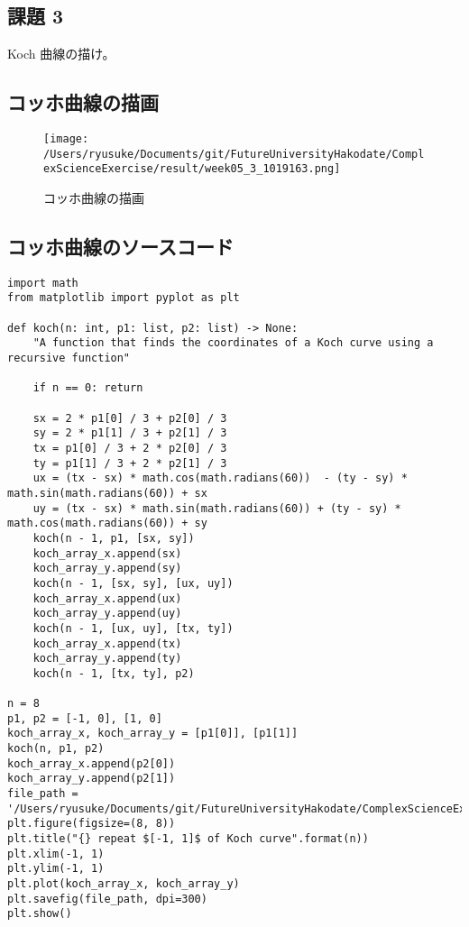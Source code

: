 \documentclass[a4j]{jsarticle}
\begin{document}
\newpage

\subsection{課題 3}
  Koch 曲線の描け。\\

\subsection{コッホ曲線の描画}
  \begin{figure}[htbp]
    \begin{center}
    \texttt{[image: /Users/ryusuke/Documents/git/FutureUniversityHakodate/ComplexScienceExercise/result/week05\_3\_1019163.png]}
    \caption{コッホ曲線の描画}
    \end{center}
  \end{figure}

\newpage

\subsection{コッホ曲線のソースコード}

\begin{lstlisting}[caption=Pythonによるコッホ曲線の描画]
import math
from matplotlib import pyplot as plt

def koch(n: int, p1: list, p2: list) -> None:
    "A function that finds the coordinates of a Koch curve using a recursive function"

    if n == 0: return

    sx = 2 * p1[0] / 3 + p2[0] / 3
    sy = 2 * p1[1] / 3 + p2[1] / 3
    tx = p1[0] / 3 + 2 * p2[0] / 3
    ty = p1[1] / 3 + 2 * p2[1] / 3
    ux = (tx - sx) * math.cos(math.radians(60))  - (ty - sy) * math.sin(math.radians(60)) + sx
    uy = (tx - sx) * math.sin(math.radians(60)) + (ty - sy) * math.cos(math.radians(60)) + sy
    koch(n - 1, p1, [sx, sy])
    koch_array_x.append(sx)
    koch_array_y.append(sy)
    koch(n - 1, [sx, sy], [ux, uy])
    koch_array_x.append(ux)
    koch_array_y.append(uy)
    koch(n - 1, [ux, uy], [tx, ty])
    koch_array_x.append(tx)
    koch_array_y.append(ty)
    koch(n - 1, [tx, ty], p2)

n = 8
p1, p2 = [-1, 0], [1, 0]
koch_array_x, koch_array_y = [p1[0]], [p1[1]]
koch(n, p1, p2)
koch_array_x.append(p2[0])
koch_array_y.append(p2[1])
file_path = '/Users/ryusuke/Documents/git/FutureUniversityHakodate/ComplexScienceExercise/result/week05_3_1019163'
plt.figure(figsize=(8, 8))
plt.title("{} repeat $[-1, 1]$ of Koch curve".format(n))
plt.xlim(-1, 1)
plt.ylim(-1, 1)
plt.plot(koch_array_x, koch_array_y)
plt.savefig(file_path, dpi=300)
plt.show()
\end{lstlisting}
\end{document}
